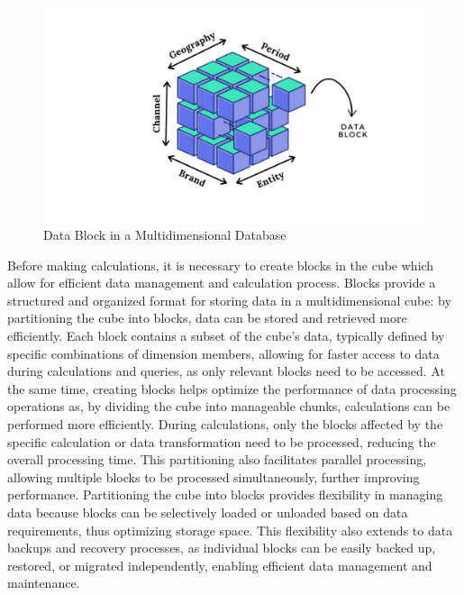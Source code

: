 \documentclass[12pt,a4paper,openright,twoside]{book}
\begin{document}
\begin{figure}[htbp]
	\centering
	\includegraphics[width=\linewidth]{figures/cube.pdf}
	\caption{Data Block in a Multidimensional Database}
	\label{fig:cube}
\end{figure}

Before making calculations, it is necessary to create blocks in the cube which allow for efficient data management and calculation process.
%
Blocks provide a structured and organized format for storing data in a multidimensional cube: by partitioning the cube into blocks, data can be stored and retrieved more efficiently. 
%
Each block contains a subset of the cube's data, typically defined by specific combinations of dimension members, allowing for faster access to data during calculations and queries, as only relevant blocks need to be accessed.
%
At the same time, creating blocks helps optimize the performance of data processing operations as, by dividing the cube into manageable chunks, calculations can be performed more efficiently. 
%
During calculations, only the blocks affected by the specific calculation or data transformation need to be processed, reducing the overall processing time. 
%
This partitioning also facilitates parallel processing, allowing multiple blocks to be processed simultaneously, further improving performance.
%
Partitioning the cube into blocks provides flexibility in managing data because blocks can be selectively loaded or unloaded based on data requirements, thus optimizing storage space. 
%
This flexibility also extends to data backups and recovery processes, as individual blocks can be easily backed up, restored, or migrated independently, enabling efficient data management and maintenance.
\end{document}
